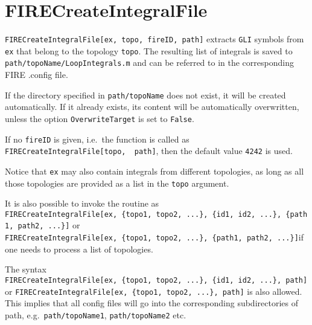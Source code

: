 \documentclass[../FeynHelpersManual.tex]{subfiles}
\begin{document}
\hypertarget{firecreateintegralfile}{
\section{FIRECreateIntegralFile}\label{firecreateintegralfile}}

\texttt{FIRECreateIntegralFile[\allowbreak{}ex,\ \allowbreak{}topo,\ \allowbreak{}fireID,\ \allowbreak{}path]}
extracts \texttt{GLI} symbols from \texttt{ex} that belong to the
topology \texttt{topo}. The resulting list of integrals is saved to
\texttt{path/topoName/LoopIntegrals.m} and can be referred to in the
corresponding FIRE .config file.

If the directory specified in \texttt{path/topoName} does not exist, it
will be created automatically. If it already exists, its content will be
automatically overwritten, unless the option \texttt{OverwriteTarget} is
set to \texttt{False}.

If no \texttt{fireID} is given, i.e.~the function is called as
\texttt{FIRECreateIntegralFile[\allowbreak{}topo,\ \allowbreak{} path]},
then the default value \texttt{4242} is used.

Notice that \texttt{ex} may also contain integrals from different
topologies, as long as all those topologies are provided as a list in
the \texttt{topo} argument.

It is also possible to invoke the routine as
\texttt{FIRECreateIntegralFile[\allowbreak{}ex,\ \allowbreak{}\{\allowbreak{}topo1,\ \allowbreak{}topo2,\ \allowbreak{}...\},\ \allowbreak{}\{\allowbreak{}id1,\ \allowbreak{}id2,\ \allowbreak{}...\},\ \allowbreak{}\{\allowbreak{}path1,\ \allowbreak{}path2,\ \allowbreak{}...\}]}
or
\texttt{FIRECreateIntegralFile[\allowbreak{}ex,\ \allowbreak{}\{\allowbreak{}topo1,\ \allowbreak{}topo2,\ \allowbreak{}...\},\ \allowbreak{}\{\allowbreak{}path1,\ \allowbreak{}path2,\ \allowbreak{}...\}]}if
one needs to process a list of topologies.

The syntax
\texttt{FIRECreateIntegralFile[\allowbreak{}ex,\ \allowbreak{}\{\allowbreak{}topo1,\ \allowbreak{}topo2,\ \allowbreak{}...\},\ \allowbreak{}\{\allowbreak{}id1,\ \allowbreak{}id2,\ \allowbreak{}...\},\ \allowbreak{}path]}
or
\texttt{FIRECreateIntegralFile[\allowbreak{}ex,\ \allowbreak{}\{\allowbreak{}topo1,\ \allowbreak{}topo2,\ \allowbreak{}...\},\ \allowbreak{}path]}
is also allowed. This implies that all config files will go into the
corresponding subdirectories of path, e.g.~\texttt{path/topoName1},
\texttt{path/topoName2} etc.
\end{document}
